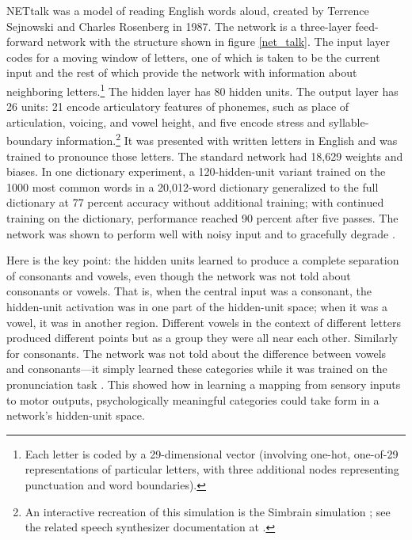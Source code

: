 NETtalk \cite{sejnowski1987parallel} was a model of reading English words aloud, created by Terrence Sejnowski and Charles Rosenberg in 1987. The network is a three-layer feed-forward network with the structure shown in figure \ref{net_talk}. The input layer codes for a moving window of letters, one of which is taken to be the current input and the rest of which provide the network with information about neighboring letters.\footnote{Each letter is coded by a 29-dimensional vector (involving one-hot, one-of-29 representations of particular letters, with three additional nodes representing punctuation and word boundaries).} The hidden layer has 80 hidden units. The output layer has 26 units: 21 encode articulatory features of phonemes, such as place of articulation, voicing, and vowel height, and five encode stress and syllable-boundary information.\footnote{An interactive recreation of this simulation is the Simbrain simulation ; see the related speech synthesizer documentation at .} It was presented with written letters in English and was trained to pronounce those letters. The standard network had 18,629 weights and biases. In one dictionary experiment, a 120-hidden-unit variant trained on the 1000 most common words in a 20,012-word dictionary generalized to the full dictionary at 77 percent accuracy without additional training; with continued training on the dictionary, performance reached 90 percent after five passes. The network was shown to perform well with noisy input and to gracefully degrade \cite{sejnowski1987parallel}.

Here is the key point: the hidden units learned to produce a complete separation of consonants and vowels, even though the network was not told about consonants or vowels. That is, when the central input was a consonant, the hidden-unit activation was in one part of the hidden-unit space; when it was a vowel, it was in another region. Different vowels in the context of different letters produced different points but as a group they were all near each other. Similarly for consonants. The network was not told about the difference between vowels and consonants---it simply learned these categories while it was trained on the pronunciation task \cite{sejnowski1987parallel}. This showed how in learning a mapping from sensory inputs to motor outputs, psychologically meaningful categories could take form in a network's hidden-unit space.

